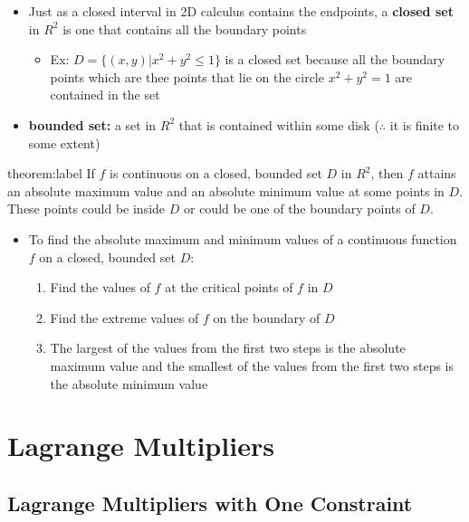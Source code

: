 \documentclass{package/notes}
\begin{document}
\begin{itemize}
	\item Just as a closed interval in 2D calculus contains the endpoints, a \textbf{closed set} in $R^2$ is one that contains all the boundary points
	\begin{itemize}
		\item Ex: $D = \{(x,y) | x^2+y^2\le1\}$ is a closed set because all the boundary points which are thee points that lie on the circle $x^2+y^2=1$ are contained in the set
	\end{itemize}
	\item \textbf{bounded set:} a set in $R^2$ that is contained within some disk ($\therefore$ it is finite to some extent)
\end{itemize}

\begin{theorem}{theorem:label}
	If $f$ is continuous on a closed, bounded set $D$ in $R^2$, then $f$ attains an absolute maximum value  and an absolute minimum value at some points in $D$. These points could be inside $D$ or could be one of the boundary points of $D$.
\end{theorem}

\begin{itemize}
	\item To find the absolute maximum and minimum values of a continuous function $f$ on a closed, bounded set $D$:
	\begin{enumerate}
		\item Find the values of $f$ at the critical points of $f$ in $D$
		\item Find the extreme values of $f$ on the boundary of $D$
		\item The largest of the values from the first two steps is the absolute maximum value and the smallest of the values from the first two steps is the absolute minimum value
	\end{enumerate}
\end{itemize}



\section{Lagrange Multipliers}


\subsection{Lagrange Multipliers with One Constraint}
\end{document}
